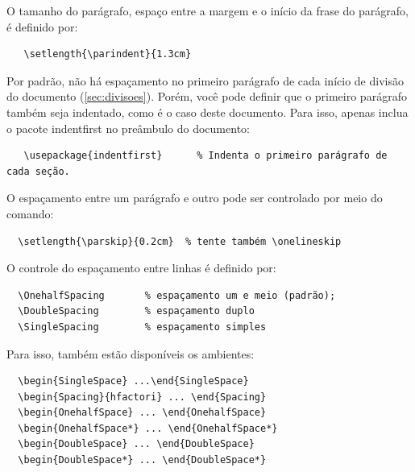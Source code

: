 O tamanho do parágrafo, espaço entre a margem e o início da frase do parágrafo, é definido por:

\begin{verbatim}
   \setlength{\parindent}{1.3cm}
\end{verbatim}

Por padrão, não há espaçamento no primeiro parágrafo de cada início de divisão do documento (\autoref{sec:divisoes}).
  Porém, você pode definir que o primeiro parágrafo também seja indentado, como é o caso deste documento.
  Para isso, apenas inclua o pacote \textsf{indentfirst} no preâmbulo do documento:
\begin{verbatim}
   \usepackage{indentfirst}      % Indenta o primeiro parágrafo de cada seção.
\end{verbatim}

O espaçamento entre um parágrafo e outro pode ser controlado por meio do comando:
\begin{verbatim}
  \setlength{\parskip}{0.2cm}  % tente também \onelineskip
\end{verbatim}

O controle do espaçamento entre linhas é definido por:
\begin{verbatim}
  \OnehalfSpacing       % espaçamento um e meio (padrão);
  \DoubleSpacing        % espaçamento duplo
  \SingleSpacing        % espaçamento simples
\end{verbatim}

Para isso, também estão disponíveis os ambientes:
\begin{verbatim}
  \begin{SingleSpace} ...\end{SingleSpace}
  \begin{Spacing}{hfactori} ... \end{Spacing}
  \begin{OnehalfSpace} ... \end{OnehalfSpace}
  \begin{OnehalfSpace*} ... \end{OnehalfSpace*}
  \begin{DoubleSpace} ... \end{DoubleSpace}
  \begin{DoubleSpace*} ... \end{DoubleSpace*}
\end{verbatim}

